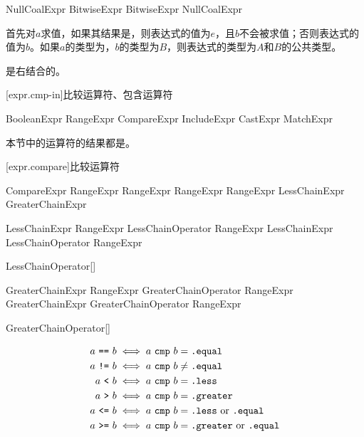 \begin{bnf}{NullCoalExpr}
    BitwiseExpr \br
    BitwiseExpr  NullCoalExpr
\end{bnf}

\pnum
{}首先对$a$求值，如果其结果是，则表达式的值为$e$，且$b$不会被求值；否则表达式的值为$b$。如果$a$的类型为，$b$的类型为$B$，则表达式的类型为$A$和$B$的公共类型。

\pnum
{}是右结合的。

[expr.cmp-in]{比较运算符、包含运算符}

\begin{bnf}{BooleanExpr}
    RangeExpr \br
    CompareExpr \br
    IncludeExpr \br
    CastExpr \br
    MatchExpr
\end{bnf}

\pnum
本节中的运算符的结果都是。

[expr.compare]{比较运算符}

\begin{bnf}{CompareExpr}
    RangeExpr \terminal{!=} RangeExpr \br
    RangeExpr  RangeExpr \br
    LessChainExpr \br
    GreaterChainExpr
\end{bnf}

\begin{bnf}{LessChainExpr}
    RangeExpr LessChainOperator RangeExpr \br
    LessChainExpr LessChainOperator RangeExpr
\end{bnf}

\begin{bnf}{LessChainOperator}[\oneof]
    \terminal{< == <=}
\end{bnf}

\begin{bnf}{GreaterChainExpr}
    RangeExpr GreaterChainOperator RangeExpr \br
    GreaterChainExpr GreaterChainOperator RangeExpr
\end{bnf}

\begin{bnf}{GreaterChainOperator}[\oneof]
    \terminal{> == >=}
\end{bnf}

\begin{align*}
a\ \tcode{==}\ b &\iff a\ \tcode{cmp}\ b = \tcode{.equal} \\
a\ \tcode{!=}\ b &\iff a\ \tcode{cmp}\ b \ne \tcode{.equal} \\
a\ \tcode{<}\ b &\iff a\ \tcode{cmp}\ b = \tcode{.less} \\
a\ \tcode{>}\ b &\iff a\ \tcode{cmp}\ b = \tcode{.greater} \\
a\ \tcode{<=}\ b &\iff a\ \tcode{cmp}\ b = \tcode{.less}\ \mathrm{or} \ \tcode{.equal} \\
a\ \tcode{>=}\ b &\iff a\ \tcode{cmp}\ b = \tcode{.greater}\ \mathrm{or} \ \tcode{.equal} \\
\end{align*}

